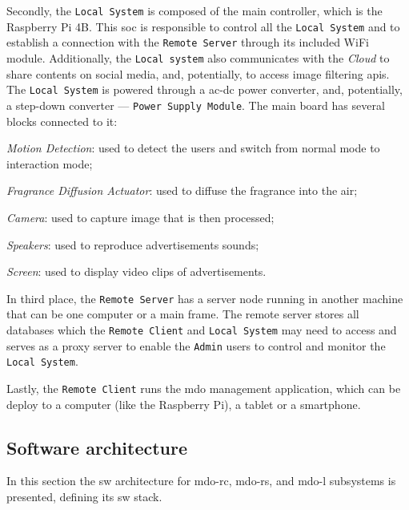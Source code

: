 Secondly, the \texttt{Local System} is composed of the main controller, which is the Raspberry Pi 4B. 
This \gls{soc} is responsible to control all the \texttt{Local System} and to establish a
connection with the \texttt{Remote Server} through its included WiFi
module. Additionally, the \texttt{Local system} also communicates with the
\textit{Cloud} to share contents on social media, and, potentially, to access
image filtering \gls{api}s.
The \texttt{Local System} is powered through a \gls{ac}-\gls{dc} power
converter, and, potentially, a step-down converter --- \texttt{Power Supply Module}.
The main board has several blocks connected to it:
%
\begin{item-c}
\item \emph{Motion Detection}: used to detect the users and switch from normal mode to interaction mode;
\item \emph{Fragrance Diffusion Actuator}: used to diffuse the fragrance into the air;
\item \emph{Camera}: used to capture image that is then processed;
\item \emph{Speakers}: used to reproduce advertisements sounds;
\item \emph{Screen}: used to display video clips of advertisements.
\end{item-c}
%

In third place, the \texttt{Remote Server} has a server node running in another machine that can be one computer or a main frame.
The remote server stores all databases which the \texttt{Remote Client} and
\texttt{Local System} may need to access and serves as a proxy server to enable
the \texttt{Admin} users to control and monitor the \texttt{Local System}.

Lastly, the \texttt{Remote Client} runs the \gls{mdo} management application,
which can be deploy to a computer (like the Raspberry Pi), a tablet or a smartphone.
%
\subsection{Software architecture}
\label{sec:softw-arch}
In this section the \gls{sw} architecture for \gls{mdo-rc}, \gls{mdo-rs}, and
\gls{mdo-l} subsystems is presented, defining its \gls{sw} stack.

